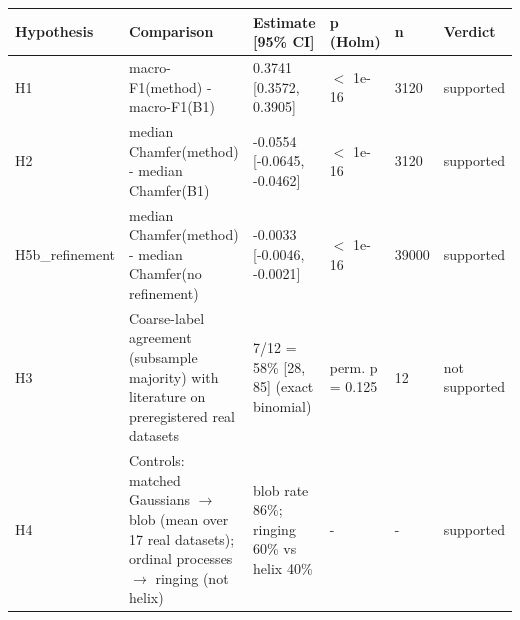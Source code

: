 \scriptsize
\begin{tabular}{llllll}
\toprule
\textbf{Hypothesis} & \textbf{Comparison} & \textbf{Estimate [95\% CI]} & \textbf{p (Holm)} & \textbf{n} & \textbf{Verdict} \\
\midrule
H1 & macro-F1(method) - macro-F1(B1) & 0.3741 [0.3572, 0.3905] & $<$ 1e-16 & 3120 & supported \\
H2 & median Chamfer(method) - median Chamfer(B1) & -0.0554 [-0.0645, -0.0462] & $<$ 1e-16 & 3120 & supported \\
H5b\_refinement & median Chamfer(method) - median Chamfer(no refinement) & -0.0033 [-0.0046, -0.0021] & $<$ 1e-16 & 39000 & supported \\
H3 & Coarse-label agreement (subsample majority) with literature on preregistered real datasets & 7/12 = 58\% [28, 85] (exact binomial) & perm. p = 0.125 & 12 & not supported \\
H4 & Controls: matched Gaussians $\to$ blob (mean over 17 real datasets); ordinal processes $\to$ ringing (not helix) & blob rate 86\%; ringing 60\% vs helix 40\% & - & - & supported \\
\bottomrule
\end{tabular}
